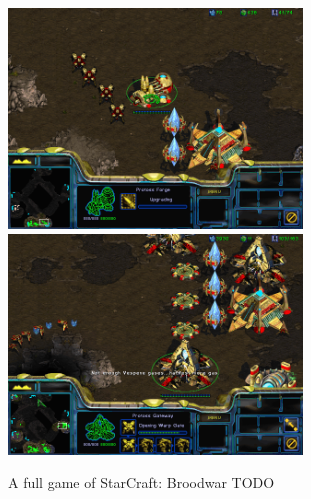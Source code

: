 \begin{figure}[!ht]
\begin{center}
\includegraphics[width=7.8cm]{images/SC_game/SC_upgrade_attack.png}
\includegraphics[width=7.8cm]{images/SC_game/SC_queue_production.png}
\label{fig:SC_game1}
\caption{A full game of StarCraft: Broodwar TODO}
\end{center}
\end{figure}

